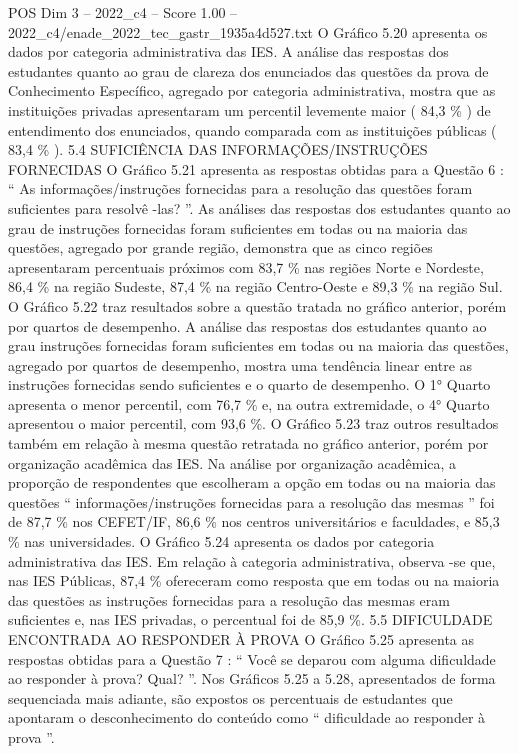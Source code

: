 \begin{textsample}{POS Dim 3 – 2022\_c4 – Score 1.00 – 2022\_c4/enade\_2022\_tec\_gastr\_1935a4d527.txt}
O Gráfico 5.20 apresenta os dados por categoria administrativa das IES.
A análise das respostas dos estudantes quanto ao grau de clareza dos enunciados das questões da prova de Conhecimento Específico, agregado por categoria administrativa, mostra que as instituições privadas apresentaram um percentil levemente maior ( 84,3 \% ) de entendimento dos enunciados, quando comparada com as instituições públicas ( 83,4 \% ). 5.4 SUFICIÊNCIA DAS INFORMAÇÕES/INSTRUÇÕES FORNECIDAS O Gráfico 5.21 apresenta as respostas obtidas para a Questão 6 : “ As informações/instruções fornecidas para a resolução das questões foram suficientes para resolvê -las? ”.
As análises das respostas dos estudantes quanto ao grau de instruções fornecidas foram suficientes em todas ou na maioria das questões, agregado por grande região, demonstra que as cinco regiões apresentaram percentuais próximos com 83,7 \% nas regiões Norte e Nordeste, 86,4 \% na região Sudeste, 87,4 \% na região Centro-Oeste e 89,3 \% na região Sul.
O Gráfico 5.22 traz resultados sobre a questão tratada no gráfico anterior, porém por quartos de desempenho.
A análise das respostas dos estudantes quanto ao grau instruções fornecidas foram suficientes em todas ou na maioria das questões, agregado por quartos de desempenho, mostra uma tendência linear entre as instruções fornecidas sendo suficientes e o quarto de desempenho.
O 1{\EmojiFont °} Quarto apresenta o menor percentil, com 76,7 \% e, na outra extremidade, o 4{\EmojiFont °} Quarto apresentou o maior percentil, com 93,6 \%.
O Gráfico 5.23 traz outros resultados também em relação à mesma questão retratada no gráfico anterior, porém por organização acadêmica das IES.
Na análise por organização acadêmica, a proporção de respondentes que escolheram a opção em todas ou na maioria das questões “ informações/instruções fornecidas para a resolução das mesmas ” foi de 87,7 \% nos CEFET/IF, 86,6 \% nos centros universitários e faculdades, e 85,3 \% nas universidades.
O Gráfico 5.24 apresenta os dados por categoria administrativa das IES.
Em relação à categoria administrativa, observa -se que, nas IES Públicas, 87,4 \% ofereceram como resposta que em todas ou na maioria das questões as instruções fornecidas para a resolução das mesmas eram suficientes e, nas IES privadas, o percentual foi de 85,9 \%. 5.5 DIFICULDADE ENCONTRADA AO RESPONDER À PROVA O Gráfico 5.25 apresenta as respostas obtidas para a Questão 7 : “ Você se deparou com alguma dificuldade ao responder à prova?
Qual? ”.
Nos Gráficos 5.25 a 5.28, apresentados de forma sequenciada mais adiante, são expostos os percentuais de estudantes que apontaram o desconhecimento do conteúdo como “ dificuldade ao responder à prova ”.

\end{textsample}
